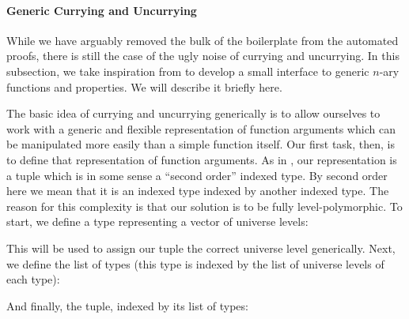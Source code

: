 \paragraph{Generic Currying and Uncurrying}
While we have arguably removed the bulk of the boilerplate from the automated
proofs, there is still the case of the ugly noise of currying and uncurrying.
In this subsection, we take inspiration from
\citet{allaisGenericLevelPolymorphic2019} to develop a small interface to generic
\(n\)-ary functions and properties.
We will describe it briefly here.

The basic idea of currying and uncurrying generically is to allow ourselves to
work with a generic and flexible representation of function arguments which can
be manipulated more easily than a simple function itself.
Our first task, then, is to define that representation of function arguments.
As in \citet{allaisGenericLevelPolymorphic2019}, our representation is a tuple
which is in some sense a ``second order'' indexed type.
By second order here we mean that it is an indexed type indexed by another
indexed type.
The reason for this complexity is that our solution is to be fully
level-polymorphic.
To start, we define a type representing a vector of universe levels:

\begin{minipage}{\linewidth}
  \begin{multicols}{2}
    \begin{agdalisting*}
    \end{agdalisting*} \columnbreak
    \begin{agdalisting*}
    \end{agdalisting*} \vspace{\baselineskip}
  \end{multicols}
\end{minipage}

This will be used to assign our tuple the correct universe level generically.
Next, we define the list of types (this type is indexed by the list of universe
levels of each type):
\begin{agdalisting*}
\end{agdalisting*}
And finally, the tuple, indexed by its list of types:

